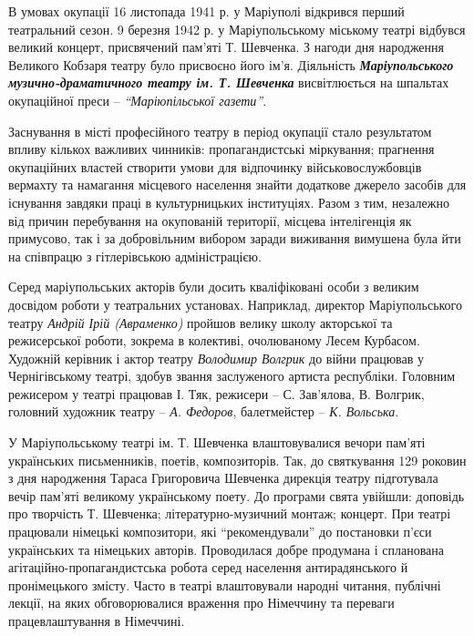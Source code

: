 В умовах окупації 16 листопада 1941 р. у Маріуполі відкрився перший театральний
сезон. 9 березня 1942 р. у Маріупольському міському театрі відбувся великий
концерт, присвячений пам'яті Т. Шевченка. З нагоди дня народження Великого
Кобзаря театру було присвоєно його ім'я. Діяльність \textbf{\em Маріупольського
музично-драматичного театру ім. Т. Шевченка} висвітлюється на шпальтах
окупаційної преси – \emph{\enquote{Маріюпільської газети}}. 


Заснування в місті професійного театру в період окупації стало результатом
впливу кількох важливих чинників: пропагандистські міркування; прагнення
окупаційних властей створити умови для відпочинку військовослужбовців вермахту
та намагання місцевого населення знайти додаткове джерело засобів для існування
завдяки праці в культурницьких інституціях. Разом з тим, незалежно від причин
перебування на окупованій території, місцева інтелігенція як примусово, так і
за добровільним вибором заради виживання вимушена була йти на співпрацю з
гітлерівською адміністрацією.

Серед маріупольських акторів були досить кваліфіковані особи з великим досвідом
роботи у театральних установах. Наприклад, директор Маріупольського театру
\emph{Андрій Ірій (Авраменко)} пройшов велику школу акторської та режисерської роботи,
зокрема в колективі, очолюваному Лесем Курбасом. Художній керівник і актор
театру \emph{Володимир Волгрик} до війни працював у Чернігівському театрі, здобув
звання заслуженого артиста республіки. Головним режисером у театрі працював І.
Тяк, режисери – С. Зав'ялова, В. Волгрик, головний художник театру – \emph{А.
Федоров}, балетмейстер – \emph{К. Вольська}.

У Маріупольському театрі ім. Т. Шевченка влаштовувалися вечори пам'яті
українських письменників, поетів, композиторів. Так, до святкування 129 роковин
з дня народження Тараса Григоровича Шевченка дирекція театру підготувала вечір
пам'яті великому українському поету. До програми свята увійшли: доповідь про
творчість Т. Шевченка; літературно-музичний монтаж; концерт. При театрі
працювали німецькі композитори, які \enquote{рекомендували} до постановки п'єси
українських та німецьких авторів. Проводилася добре продумана і спланована
агітаційно-пропагандистська робота серед населення антирадянського й
пронімецького змісту. Часто в театрі влаштовували народні читання, публічні
лекції, на яких обговорювалися враження про Німеччину та переваги
працевлаштування в Німеччині.

